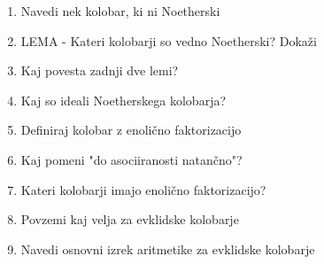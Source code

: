 \documentclass{article}
\begin{document}
\begin{enumerate}
        \item Navedi nek kolobar, ki ni Noetherski
        \item LEMA - Kateri kolobarji so vedno Noetherski? Dokaži
        \item Kaj povesta zadnji dve lemi?
        \item Kaj so ideali Noetherskega kolobarja?
        \item Definiraj kolobar z enolično faktorizacijo
        \item Kaj pomeni "do asociiranosti natančno"?
        \item Kateri kolobarji imajo enolično faktorizacijo?
        \item Povzemi kaj velja za evklidske kolobarje
        \item Navedi osnovni izrek aritmetike za evklidske kolobarje
    \end{enumerate}
\end{document}
